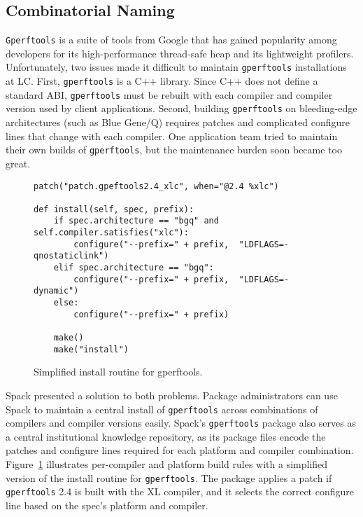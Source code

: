 
\subsection{Combinatorial Naming}
\label{sec:usecase-combinatorial}

{\tt Gperftools} is a suite of tools from Google that has gained popularity among
developers for its high-performance thread-safe heap and its lightweight profilers.
Unfortunately, two issues made it difficult to maintain {\tt gperftools} installations
at LC.  First, {\tt gperftools} is a C++ library.  Since C++ does not define a standard
ABI, {\tt gperftools} must be rebuilt with each compiler and compiler version used by client applications.  Second, building {\tt gperftools} on bleeding-edge architectures
(such as Blue Gene/Q) requires patches and complicated configure lines that
change with each compiler.  One application team tried to maintain their own
builds of {\tt gperftools}, but the maintenance burden soon became too great.

\begin{figure}
\begin{verbatim}
patch("patch.gpeftools2.4_xlc", when="@2.4 %xlc")

def install(self, spec, prefix):
    if spec.architecture == "bgq" and self.compiler.satisfies("xlc"):
        configure("--prefix=" + prefix,  "LDFLAGS=-qnostaticlink")
    elif spec.architecture == "bgq":
        configure("--prefix=" + prefix,  "LDFLAGS=-dynamic")
    else:
        configure("--prefix=" + prefix)

    make()
    make("install")
\end{verbatim}
  \caption{
    Simplified install routine for gperftools.
    \label{fig:gperftools}
  }
\end{figure}

Spack presented a solution to both problems.  Package administrators can use Spack to
maintain a central install of {\tt gperftools} across combinations of
compilers and compiler versions easily.  Spack's {\tt gperftools} package 
also serves as a central
institutional knowledge repository, as its package files encode
the patches and configure lines required for each platform and compiler combination.
%
Figure~\ref{fig:gperftools} illustrates per-compiler and platform build rules with
a simplified version of the install routine for {\tt gperftools}.
The package applies a patch if {\tt gperftools} 2.4 is built with the XL compiler,
and it selects the correct configure line based on the spec's platform and compiler.

